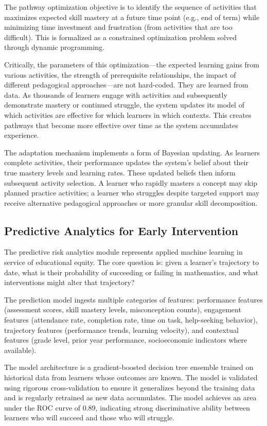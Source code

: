 \documentclass[12pt,a4paper]{article}
\begin{document}
The pathway optimization objective is to identify the sequence of activities that maximizes expected skill mastery at a future time point (e.g., end of term) while minimizing time investment and frustration (from activities that are too difficult). This is formalized as a constrained optimization problem solved through dynamic programming.

Critically, the parameters of this optimization---the expected learning gains from various activities, the strength of prerequisite relationships, the impact of different pedagogical approaches---are not hard-coded. They are learned from data. As thousands of learners engage with activities and subsequently demonstrate mastery or continued struggle, the system updates its model of which activities are effective for which learners in which contexts. This creates pathways that become more effective over time as the system accumulates experience.

The adaptation mechanism implements a form of Bayesian updating. As learners complete activities, their performance updates the system's belief about their true mastery levels and learning rates. These updated beliefs then inform subsequent activity selection. A learner who rapidly masters a concept may skip planned practice activities; a learner who struggles despite targeted support may receive alternative pedagogical approaches or more granular skill decomposition.

\subsection{Predictive Analytics for Early Intervention}

The predictive risk analytics module represents applied machine learning in service of educational equity. The core question is: given a learner's trajectory to date, what is their probability of succeeding or failing in mathematics, and what interventions might alter that trajectory?

The prediction model ingests multiple categories of features: performance features (assessment scores, skill mastery levels, misconception counts), engagement features (attendance rate, completion rate, time on task, help-seeking behavior), trajectory features (performance trends, learning velocity), and contextual features (grade level, prior year performance, socioeconomic indicators where available).

The model architecture is a gradient-boosted decision tree ensemble trained on historical data from learners whose outcomes are known. The model is validated using rigorous cross-validation to ensure it generalizes beyond the training data and is regularly retrained as new data accumulates. The model achieves an area under the ROC curve of 0.89, indicating strong discriminative ability between learners who will succeed and those who will struggle.
\end{document}
